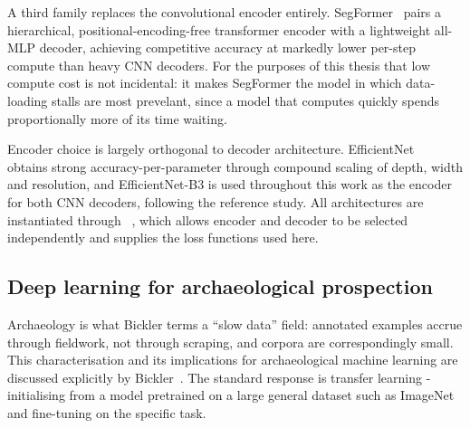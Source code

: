 A third family replaces the convolutional encoder entirely.
SegFormer~\cite{Xie21} pairs a hierarchical, positional-encoding-free transformer
encoder with a lightweight all-MLP decoder, achieving competitive accuracy at
markedly lower per-step compute than heavy CNN decoders.
For the purposes of this thesis that low compute cost is not incidental: it makes
SegFormer the model in which data-loading stalls are most prevelant, since a
model that computes quickly spends proportionally more of its time waiting.

Encoder choice is largely orthogonal to decoder architecture.
EfficientNet~\cite{Tan19} obtains strong accuracy-per-parameter through compound
scaling of depth, width and resolution, and EfficientNet-B3 is used throughout this
work as the encoder for both CNN decoders, following the reference study.
All architectures are instantiated through
~\cite{Iakubovskii19}, which allows encoder and
decoder to be selected independently and supplies the loss functions used here.

\subsection{Deep learning for archaeological prospection}
\label{sec:lit-arch}

Archaeology is what Bickler terms a ``slow data'' field: annotated examples accrue
through fieldwork, not through scraping, and corpora are correspondingly small.
This characterisation and its implications for archaeological machine learning
are discussed explicitly by Bickler~\cite{Bickler21}.
The standard response is transfer learning - initialising from a model pretrained
on a large general dataset such as ImageNet~\cite{Deng09} and fine-tuning on the
specific task.

